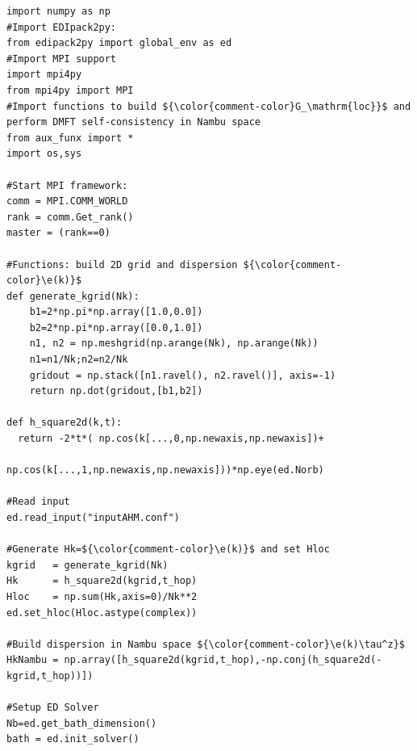 \documentclass[edipack_sp.tex]{subfiles}
\begin{document}
\begin{lstlisting}[style=mypython,numbers=none,basicstyle={\scriptsize\ttfamily}]
import numpy as np
#Import EDIpack2py:
from edipack2py import global_env as ed
#Import MPI support 
import mpi4py
from mpi4py import MPI
#Import functions to build ${\color{comment-color}G_\mathrm{loc}}$ and perform DMFT self-consistency in Nambu space
from aux_funx import * 
import os,sys

#Start MPI framework:
comm = MPI.COMM_WORLD
rank = comm.Get_rank()
master = (rank==0)

#Functions: build 2D grid and dispersion ${\color{comment-color}\e(k)}$
def generate_kgrid(Nk):
    b1=2*np.pi*np.array([1.0,0.0])
    b2=2*np.pi*np.array([0.0,1.0])
    n1, n2 = np.meshgrid(np.arange(Nk), np.arange(Nk))
    n1=n1/Nk;n2=n2/Nk
    gridout = np.stack([n1.ravel(), n2.ravel()], axis=-1)
    return np.dot(gridout,[b1,b2])
    
def h_square2d(k,t):
  return -2*t*( np.cos(k[...,0,np.newaxis,np.newaxis])+
                np.cos(k[...,1,np.newaxis,np.newaxis]))*np.eye(ed.Norb)
    
#Read input
ed.read_input("inputAHM.conf")

#Generate Hk=${\color{comment-color}\e(k)}$ and set Hloc
kgrid   = generate_kgrid(Nk)
Hk      = h_square2d(kgrid,t_hop)
Hloc    = np.sum(Hk,axis=0)/Nk**2
ed.set_hloc(Hloc.astype(complex))

#Build dispersion in Nambu space ${\color{comment-color}\e(k)\tau^z}$
HkNambu = np.array([h_square2d(kgrid,t_hop),-np.conj(h_square2d(-kgrid,t_hop))])

#Setup ED Solver
Nb=ed.get_bath_dimension()
bath = ed.init_solver()
\end{lstlisting}
\end{document}
